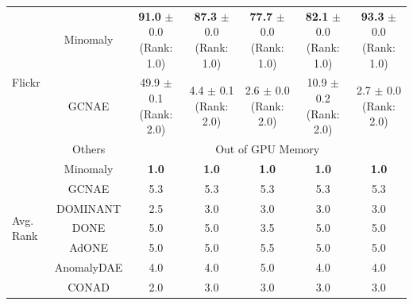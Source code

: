 \begin{table}[htbp]
{\begin{tabular}{|l|c|c|c|c|c|c|}
    \multirow{3}{*}{Flickr}
    & Minomaly & \makecell{\textbf{91.0} $\pm$ 0.0 \\[1pt] \tiny (Rank: 1.0)} & \makecell{\textbf{87.3} $\pm$ 0.0 \\[1pt] \tiny (Rank: 1.0)} & \makecell{\textbf{77.7} $\pm$ 0.0 \\[1pt] \tiny (Rank: 1.0)} & \makecell{\textbf{82.1} $\pm$ 0.0 \\[1pt] \tiny (Rank: 1.0)} & \makecell{\textbf{93.3} $\pm$ 0.0 \\[1pt] \tiny (Rank: 1.0)} \\
    & GCNAE & \makecell{49.9 $\pm$ 0.1 \\[1pt] \tiny (Rank: 2.0)} & \makecell{4.4 $\pm$ 0.1 \\[1pt] \tiny (Rank: 2.0)} & \makecell{2.6 $\pm$ 0.0 \\[1pt] \tiny (Rank: 2.0)} & \makecell{10.9 $\pm$ 0.2 \\[1pt] \tiny (Rank: 2.0)} & \makecell{2.7 $\pm$ 0.0 \\[1pt] \tiny (Rank: 2.0)} \\ 
    & Others & \multicolumn{5}{c|}{Out of GPU Memory} \\ \hline
    \multirow{7}{*}{Avg. Rank}
    & Minomaly & \textbf{1.0} & \textbf{1.0} & \textbf{1.0} & \textbf{1.0} & \textbf{1.0} \\
    & GCNAE & 5.3 & 5.3 & 5.3 & 5.3 & 5.3 \\
    & DOMINANT & 2.5 & 3.0 & 3.0 & 3.0 & 3.0 \\
    & DONE & 5.0 & 5.0 & 3.5 & 5.0 & 5.0 \\
    & AdONE & 5.0 & 5.0 & 5.5 & 5.0 & 5.0 \\
    & AnomalyDAE & 4.0 & 4.0 & 5.0 & 4.0 & 4.0 \\
    & CONAD & 2.0 & 3.0 & 3.0 & 3.0 & 3.0 \\ \hline
    \end{tabular}%
    }
\end{table}